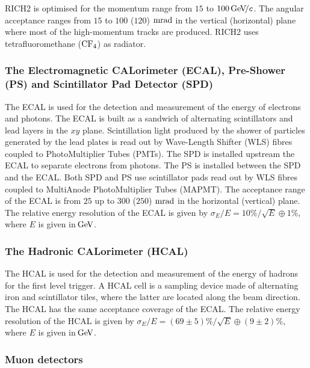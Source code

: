 RICH2 is optimised for the momentum range from $15$ to $100{\mathrm{\,Ge\kern -0.1em V\!/}c}$. The angular acceptance ranges from $15$ to $100$ ($120$) $\rm mrad$ in the vertical (horizontal) plane where most of the high-momentum tracks are produced. RICH2 uses tetrafluoromethane ($\rm CF_4$) as radiator.

\subsubsection*{The Electromagnetic CALorimeter (ECAL), Pre-Shower (PS) and Scintillator Pad Detector (SPD)}

The ECAL \cite{CAL} is used for the detection and measurement of the energy of electrons and
photons. The ECAL is built as a sandwich of alternating scintillators and
lead layers in the $xy$ plane. Scintillation light produced by the shower of
particles generated by the lead plates is read out by Wave-Length Shifter (WLS) fibres coupled
to PhotoMultiplier Tubes (PMTs). The SPD is installed upstream the ECAL to separate electrons
from photons. The PS is installed between the SPD and
the ECAL. Both SPD and PS use scintillator
pads read out by WLS fibres coupled to MultiAnode PhotoMultiplier Tubes (MAPMT). The
acceptance range of the ECAL is from $25$ up to $300$ ($250$) $\rm mrad$ in the horizontal (vertical) 
plane. The relative energy resolution of the ECAL is given by $\sigma_E / E = 10\%/\sqrt{E}\oplus 1\%$, where $E$ is given
in$\mathrm{\,Ge\kern -0.1em V}$.

\subsubsection*{The Hadronic CALorimeter (HCAL)}

The HCAL \cite{CAL} is used for the detection and measurement of the energy of hadrons 
for the first level trigger. A HCAL cell is a sampling device made of
alternating iron and scintillator tiles, where the latter are located along the beam direction. The HCAL
has the same acceptance coverage of the ECAL. The relative energy resolution of the HCAL
is given by $\sigma_E / E = (69\pm 5)\%/\sqrt{E}\oplus (9\pm 2)\%$, where $E$ is given in$\mathrm{\,Ge\kern -0.1em V}$. 

\subsubsection*{Muon detectors}

